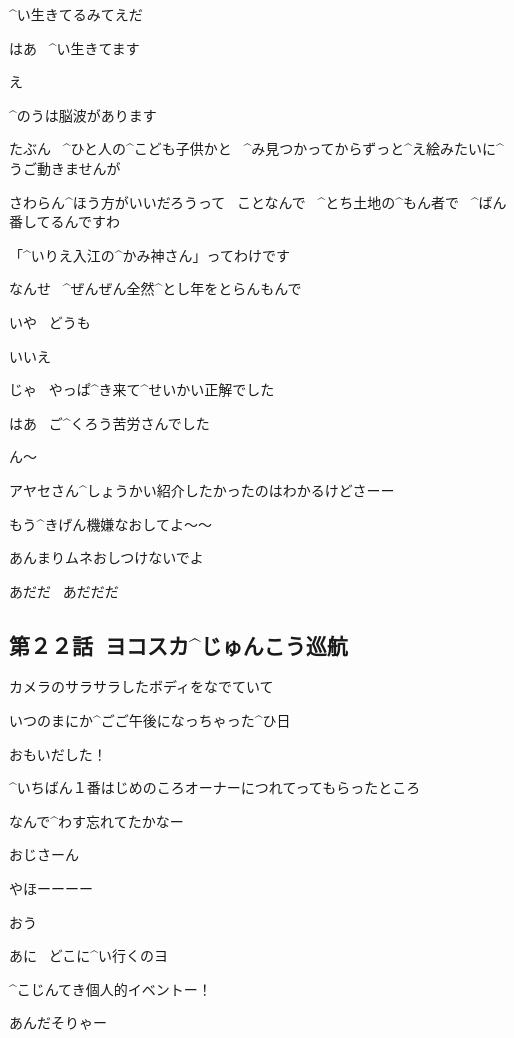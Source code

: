 \Ayase ^{い}{生}きてるみてえだ

\Person はあ
\ ^{い}{生}きてます

\Ayase え

\Person ^{のうは}{脳波}があります

\page[95]
\Person たぶん
\ ^{ひと}{人}の^{こども}{子供}かと
\ ^{み}{見}つかってからずっと^{え}{絵}みたいに^{うご}{動}きませんが

\Person さわらん^{ほう}{方}がいいだろうって
\ ことなんで
\ ^{とち}{土地}の^{もん}{者}で
\ ^{ばん}{番}してるんですわ

\Person 「^{いりえ}{入江}の^{かみ}{神}さん」ってわけです

\page[96]
\Person なんせ
\ ^{ぜんぜん}{全然}^{とし}{年}をとらんもんで

\page[97]
\Ayase いや
\ どうも

\Person いいえ

\Ayase じゃ
\ やっぱ^{き}{来}て^{せいかい}{正解}でした

\Person はあ
\ ご^{くろう}{苦労}さんでした

\Ayase ん〜

\page[98]
\Alpha アヤセさん^{しょうかい}{紹介}したかったのはわかるけどさーー

\Alpha もう^{きげん}{機嫌}なおしてよ〜〜

\Takahiro あんまりムネおしつけないでよ

\Takahiro あだだ
\ あだだだ


\subsection{第２２話\ ヨコスカ^{じゅんこう}{巡航}}

\page[102]
\Alpha カメラのサラサラしたボディをなでていて

\Alpha いつのまにか^{ごご}{午後}になっちゃった^{ひ}{日}

\page[104]
\Alpha おもいだした！

\Alpha ^{いちばん}{１番}はじめのころオーナーにつれてってもらったところ

\Alpha なんで^{わす}{忘}れてたかなー

\Alpha おじさーん

\page[105]
\Alpha やほーーーー

\Ojisan おう

\Ojisan あに
\ どこに^{い}{行}くのヨ

\Alpha ^{こじんてき}{個人的}イベントー！

\Ojisan あんだそりゃー

